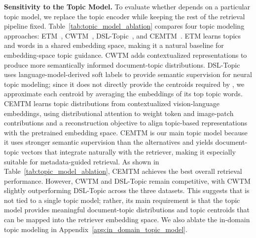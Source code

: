\noindent
\textbf{Sensitivity to the Topic Model. }
To evaluate whether \name{} depends on a particular topic model, we replace the topic encoder while keeping the rest of the retrieval pipeline fixed. Table~\ref{tab:topic_model_ablation} compares four topic modeling approaches: ETM~\cite{dieng-etal-2020-topic}, CWTM~\cite{fang-etal-2024-cwtm}, DSL-Topic~\cite{li2026improvingneuraltopicmodeling}, and CEMTM~\cite{abaskohi-etal-2025-cemtm}. ETM learns topics and words in a shared embedding space, making it a natural baseline for embedding-space topic guidance. CWTM adds contextualized representations to produce more semantically informed document-topic distributions. DSL-Topic uses language-model-derived soft labels to provide semantic supervision for neural topic modeling; since it does not directly provide the centroids required by \name{}, we approximate each centroid by averaging the embeddings of its top topic words. CEMTM learns topic distributions from contextualized vision-language embeddings, using distributional attention to weight token and image-patch contributions and a reconstruction objective to align topic-based representations with the pretrained embedding space. CEMTM is our main topic model because it uses stronger semantic supervision than the alternatives and yields document-topic vectors that integrate naturally with the retriever, making it especially suitable for metadata-guided retrieval. As shown in Table~\ref{tab:topic_model_ablation}, CEMTM achieves the best overall retrieval performance. However, CWTM and DSL-Topic remain competitive, with CWTM slightly outperforming DSL-Topic across the three datasets. This suggests that \name{} is not tied to a single topic model; rather, its main requirement is that the topic model provides meaningful document-topic distributions and topic centroids that can be mapped into the retriever embedding space. We also ablate the in-domain topic modeling in Appendix~\ref{app:in_domain_topic_model}.